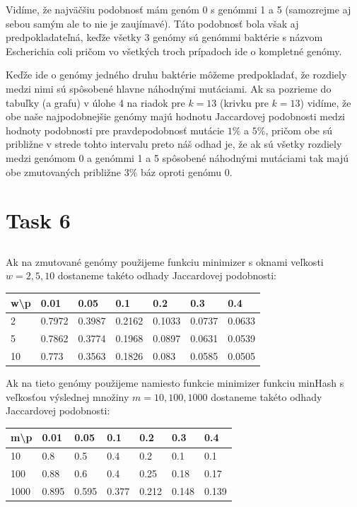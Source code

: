 \documentclass[a4paper]{article}
\begin{document}
Vidíme, že najväčšiu podobnosť mám genóm 0 s genómmi 1 a 5 (samozrejme aj sebou samým ale to nie je zaujímavé). Táto podobnosť bola však aj predpokladateľná, keďže všetky 3 genómy sú genómmi baktérie s názvom Escherichia coli pričom vo všetkých troch prípadoch ide o kompletné genómy.

Keďže ide o genómy jedného druhu baktérie môžeme predpokladať, že rozdiely medzi nimi sú spôsobené hlavne náhodnými mutáciami. Ak sa pozrieme do tabuľky (a grafu) v úlohe 4 na riadok pre $k=13$ (krivku pre $k=13$) vidíme, že obe naše najpodobnejšie genómy majú hodnotu Jaccardovej podobnosti medzi hodnoty podobnosti pre pravdepodobnosť mutácie $1\%$ a $5\%$, pričom obe sú približne v strede tohto intervalu preto náš odhad je, že ak sú všetky rozdiely medzi genómom 0 a genómmi 1 a 5 spôsobené náhodnými mutáciami tak majú obe zmutovaných približne $3\%$ báz oproti genómu 0.  

\section{Task 6} 

\subsection{}

Ak na zmutované genómy použijeme funkciu minimizer s oknami veľkosti $w=2,5,10$ dostaneme takéto odhady Jaccardovej podobnosti:

\begin{table}[!h]
	\begin{tabular}{|l|l|l|l|l|l|l|}
		\hline
		w\textbackslash p & 0.01   & 0.05   & 0.1    & 0.2    & 0.3    & 0.4   \\ \hline
		2 & 0.7972 & 0.3987 & 0.2162 & 0.1033 & 0.0737 & 0.0633 \\ \hline
		5 & 0.7862 & 0.3774 & 0.1968 & 0.0897 & 0.0631 & 0.0539 \\ \hline
		10 & 0.773 & 0.3563 & 0.1826 & 0.083 & 0.0585 & 0.0505 \\ \hline
		
	\end{tabular}
\end{table}

Ak na tieto genómy použijeme namiesto funkcie minimizer funkciu minHash s veľkosťou výslednej množiny $m=10,100,1000$ dostaneme takéto odhady Jaccardovej podobnosti: 

\begin{table}[!h]
	\begin{tabular}{|l|l|l|l|l|l|l|}
		\hline
		m\textbackslash p & 0.01   & 0.05   & 0.1    & 0.2    & 0.3    & 0.4   \\ \hline
		10 &0.8 &0.5 &0.4 &0.2 &0.1 &0.1 \\ \hline
		100 &0.88 &0.6 &0.4 &0.25 &0.18 &0.17 \\ \hline
		1000 &0.895 &0.595 &0.377 &0.212 &0.148 &0.139 \\ \hline
		
	\end{tabular}
\end{table}
\end{document}
